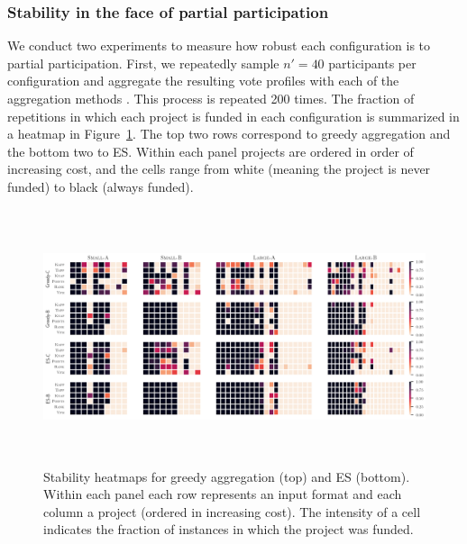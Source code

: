\documentclass[mnsc,blindrev]{informs3_freeuse} %
\newcommand{\points}{\textsc{Points}}
\newcommand{\mes}{ES}
\begin{document}


 

\subsubsection{Stability in the face of partial participation}  
\label{sec:stability}
 
We conduct two experiments to measure how robust each configuration is to partial participation. 
First, we repeatedly sample $n'=40$ participants per configuration  and aggregate the resulting vote profiles with each of the aggregation methods . This process is repeated 200 times. %
%
The fraction of repetitions in which each project is funded in each configuration is summarized   in a heatmap in Figure~\ref{fig:heatmap}. The top two rows correspond to greedy aggregation and the bottom two to  \mes. Within each panel projects are ordered in order of increasing cost, and the cells range from white (meaning the project is never funded) to black (always funded). 

\begin{figure}[htb]
\begin{center}
\includegraphics[width=15.5cm, height=7.5cm]{../experiment/heatmaps_all.png}
\caption{Stability heatmaps for  greedy aggregation (top) and \mes{} (bottom).
Within each panel each row represents an   input format and each column a project (ordered in increasing cost). The intensity of a cell indicates the fraction of instances in which the project was funded. 
}\label{fig:heatmap}
\end{center}\vspace{-3mm}
\end{figure}
\end{document}
